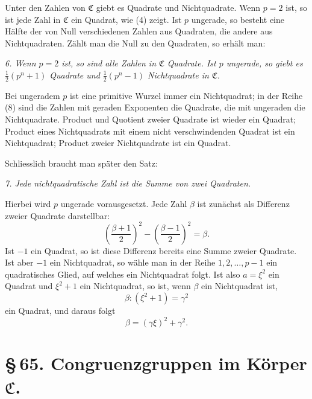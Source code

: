\documentclass[11pt]{article}
\begin{document}
Unter den Zahlen von $\mathfrak C$ giebt es Quadrate und Nichtquadrate. Wenn $p=2$ ist, so ist jede Zahl in $\mathfrak C$ ein Quadrat, wie (4) zeigt. Ist $p$ ungerade, so besteht eine Hälfte der von Null verschiedenen Zahlen aus Quadraten, die andere aus Nichtquadraten. Zählt man die Null zu den Quadraten, so erhält man:

\emph{6. Wenn $p=2$ ist, so sind alle Zahlen in $\mathfrak C$ Quadrate. Ist $p$ ungerade, so giebt es $\frac12(p^n+1)$ Quadrate und $\frac12(p^n-1)$ Nichtquadrate in $\mathfrak C$.}

Bei ungeradem $p$ ist eine primitive Wurzel immer ein Nichtquadrat; in der Reihe (8) sind die Zahlen mit geraden Exponenten die Quadrate, die mit ungeraden die Nichtquadrate. Product und Quotient zweier Quadrate ist wieder ein Quadrat; Product eines Nichtquadrats mit einem nicht verschwindenden Quadrat ist ein Nichtquadrat; Product zweier Nichtquadrate ist ein Quadrat.

Schliesslich braucht man später den Satz:

\emph{7. Jede nichtquadratische Zahl ist die Summe von zwei Quadraten.}

Hierbei wird $p$ ungerade vorausgesetzt. Jede Zahl $\beta$ ist zunächst als Differenz zweier Quadrate darstellbar:
\[
 \left(\frac{\beta+1}{2}\right)^2-\left(\frac{\beta-1}{2}\right)^2=\beta.
\]
Ist $-1$ ein Quadrat, so ist diese Differenz bereits eine Summe zweier Quadrate. Ist aber $-1$ ein Nichtquadrat, so wähle man in der Reihe $1,2,\ldots,p-1$ ein quadratisches Glied, auf welches ein Nichtquadrat folgt. Ist also $a=\xi^2$ ein Quadrat und $\xi^2+1$ ein Nichtquadrat, so ist, wenn $\beta$ ein Nichtquadrat ist,
\[
 \beta:(\xi^2+1)=\gamma^2
\]
ein Quadrat, und daraus folgt
\[
 \beta=(\gamma\xi)^2+\gamma^2.
\]

\section*{\S\,65. Congruenzgruppen im Körper $\mathfrak C$.}
\end{document}
